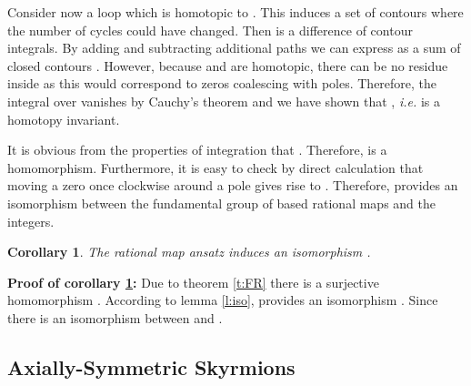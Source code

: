\documentclass[a4paper,12pt]{article}
\newtheorem {corollary}[theorem]{Corollary}
\begin{document}
Consider now a loop \coordHE{} which is homotopic to \coordHE{}. This induces a
set of contours \coordHE{} where the number of cycles could have changed. 
Then \coordHE{} is a difference of contour integrals.
By adding and subtracting additional paths we can express 
\coordHE{} as a sum of closed contours \coordHE{}. 
However, 
because \coordHE{}  and \coordHE{} are homotopic, there can be no residue inside 
\coordHE{} as this would correspond to zeros coalescing with poles. 
Therefore, the integral over \coordHE{} vanishes by Cauchy's theorem 
and we have shown that \coordHE{}, {\it i.e.} \coordHE{} is a homotopy 
invariant.

It is obvious from the properties of integration that \coordHE{}. Therefore, \coordHE{} is a homomorphism. Furthermore, it is easy to check by 
direct calculation that moving a zero once clockwise around a pole gives 
rise to \coordHE{}. 
Therefore, \coordHE{} provides an isomorphism between the fundamental 
group of based rational maps and the integers. \hfill \myHighlight{$\square$}\coordHE{} 


\begin{corollary}
\label{c:N}
The rational map ansatz induces an isomorphism \coordHE{}.
\end{corollary}

{\bf Proof of corollary \ref{c:N}:}
Due to theorem \ref{t:FR} there is a surjective homomorphism 
\coordHE{}. According to lemma \ref{l:iso}, \coordHE{} 
provides an isomorphism \coordHE{}. Since 
\coordHE{} there is an isomorphism between 
\coordHE{} and \coordHE{}. \hfill \myHighlight{$\square$}\coordHE{}\\   


\subsection{Axially-Symmetric Skyrmions}
\label{Axial}
\end{document}
